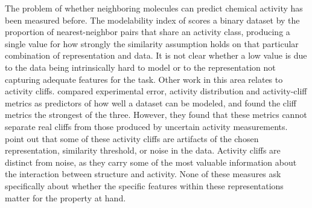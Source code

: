 The problem of whether neighboring molecules can predict chemical activity has been measured before. The modelability index of \citet{Golbraikh2014} scores a binary dataset by the proportion of nearest-neighbor pairs that share an activity class, producing a single value for how strongly the similarity assumption holds on that particular combination of representation and data. It is not clear whether a low value is due to the data being intrinsically hard to model or to the representation not capturing adequate features for the task. Other work in this area relates to activity cliffs. \citet{Sheridan2020} compared experimental error, activity distribution and activity-cliff metrics as predictors of how well a dataset can be modeled, and found the cliff metrics the strongest of the three. However, they found that these metrics cannot separate real cliffs from  those produced by uncertain activity measurements. \citet{MedinaFranco2013} point out that some of these activity cliffs are artifacts of the chosen representation, similarity threshold, or noise in the data. Activity cliffs are distinct from noise, as they carry some of the most valuable information about the interaction between structure and activity. None of these measures ask specifically about whether the specific features within these representations matter for the property at hand. 


